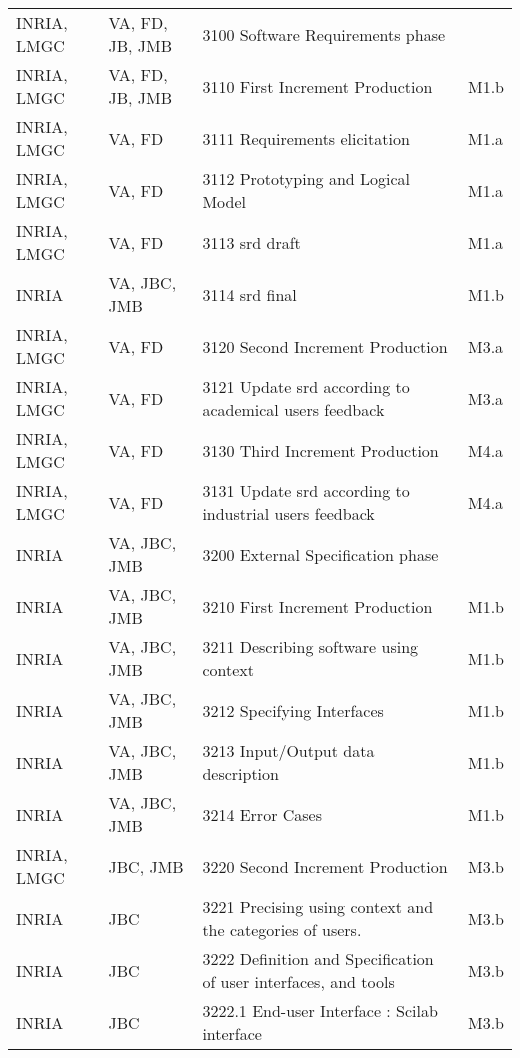 \begin{longtable}{|l|l|l|l|}
  
\pagebreak
\multicolumn{4}{|c|}{\textbf{\scriptsize Platform kernel : Siconos/Engine Siconos/Front-End Software Production}}\\ \hline 
  INRIA, LMGC & VA, FD, JB, JMB &   3100 Software Requirements phase   &  \\ \hline
  INRIA, LMGC & VA, FD, JB, JMB &   3110 First Increment Production  & M1.b \\ \hline
  INRIA, LMGC & VA, FD &   3111 Requirements elicitation                & M1.a \\ \hline
  INRIA, LMGC & VA, FD &   3112 Prototyping and Logical Model   & M1.a \\ \hline
  INRIA, LMGC & VA, FD &   3113 \ac{srd} draft          & M1.a \\ \hline
  INRIA & VA, JBC, JMB &   3114 \ac{srd} final          & M1.b \\ \hline
  INRIA, LMGC & VA, FD &   3120 Second Increment Production     & M3.a \\ \hline
  INRIA, LMGC & VA, FD &   3121 Update \ac{srd} according to academical users feedback  & M3.a \\ \hline
  INRIA, LMGC & VA, FD &   3130 Third Increment Production      & M4.a \\ \hline
  INRIA, LMGC & VA, FD &   3131 Update \ac{srd} according to industrial users feedback  & M4.a \\ \hline
  INRIA & VA, JBC, JMB &   3200 External Specification phase    &  \\ \hline
  INRIA & VA, JBC, JMB &   3210 First Increment Production              & M1.b \\ \hline
  INRIA & VA, JBC, JMB &   3211 Describing software using context & M1.b \\ \hline
  INRIA & VA, JBC, JMB &   3212 Specifying Interfaces                   & M1.b \\ \hline
  INRIA & VA, JBC, JMB &   3213 Input/Output data description   & M1.b \\ \hline
  INRIA & VA, JBC, JMB &   3214 Error Cases             & M1.b \\ \hline
  INRIA, LMGC & JBC, JMB &   3220 Second Increment Production   & M3.b \\ \hline
  INRIA & JBC &   3221 Precising using context and the categories of users. & M3.b \\ \hline
  INRIA & JBC &   3222 Definition and Specification of user interfaces, and tools  & M3.b \\ \hline
  INRIA & JBC &   3222.1 End-user Interface : Scilab interface & M3.b \\ \hline

\end{longtable}
